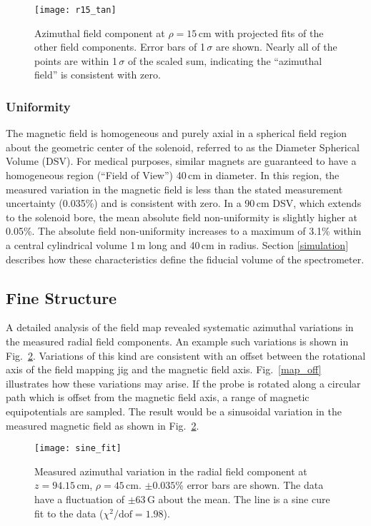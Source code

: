\begin{figure}%
\texttt{[image: r15\_tan]}%
\caption[Azimuthal  field component at $\rho=15$\,cm with projected fit of the other field components]{Azimuthal  field component at $\rho=15$\,cm with projected fits of the other field components.  Error bars of 1\,$\sigma$ are shown.  Nearly all of the points are within 1\,$\sigma$ of the scaled sum, indicating the ``azimuthal field'' is consistent with zero.}%
\label{tan_field}%
\end{figure}

\subsubsection{Uniformity}

The magnetic field is homogeneous and purely axial in a spherical field region about the geometric center of the solenoid, referred to as the Diameter Spherical Volume (DSV).  For medical purposes, similar magnets are guaranteed to have a homogeneous region (``Field of View'') 40\,cm in diameter.  
In this region, the measured variation in the magnetic field is less than the stated measurement uncertainty (0.035\%) and is consistent with zero.  In a 90\,cm DSV, which extends to the solenoid bore, the mean absolute field non-uniformity is slightly higher at 0.05\%.  
The absolute field non-uniformity increases to a maximum of 3.1\% within a central cylindrical volume 1\,m long and 40\,cm in radius.  Section \ref{simulation} describes how these characteristics define the fiducial volume of the spectrometer.

\subsection{Fine Structure}
A detailed analysis of the field map revealed systematic azimuthal variations in the measured radial field components.  An example such variations is shown in Fig.~\ref{sine_fit}.  Variations of this kind are consistent with an offset between the rotational axis of the field mapping jig and the magnetic field axis.  Fig.~\ref{map_off} illustrates how these variations may arise.  If the probe is rotated along a circular path which is offset from the magnetic field axis, a range of magnetic equipotentials are sampled.  The result would be a sinusoidal variation in the measured magnetic field as shown in Fig.~\ref{sine_fit}.

\begin{figure}%
\centering
\texttt{[image: sine\_fit]}%
\caption[Measured azimuthal variation in the radial field component at $z=94.15$\,cm, $\rho=45$\,cm]{Measured azimuthal variation in the radial field component at $z=94.15$\,cm, $\rho=45$\,cm.   $\pm 0.035$\% error bars are shown.  The data have a fluctuation of $\pm 63$\,G about the mean.  The line is a sine cure fit to the data ($\chi^2/\textrm{dof}=1.98$).}%
\label{sine_fit}%
\end{figure}

